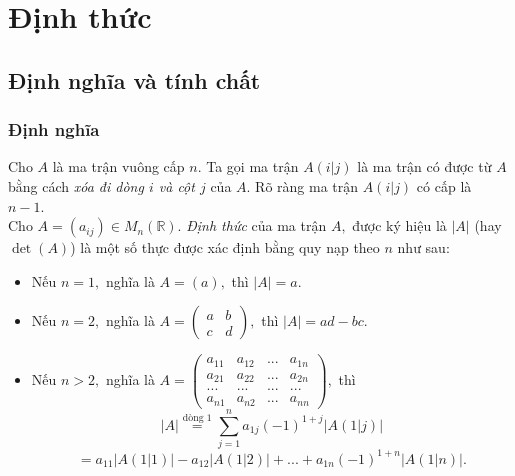 \chapter{Định thức}
\section{Định nghĩa và tính chất}
\subsection{Định nghĩa}
Cho $A$ là ma trận vuông cấp $n.$ Ta gọi ma trận $A\left( {\left. i \right|j} \right)$ là ma trận có được từ $A$ bằng cách \textit{xóa đi dòng $i$ và cột $j$} của $A.$ Rõ ràng ma trận $A\left( {\left. i \right|j} \right)$ có cấp là $n - 1.$\\
Cho $A = \left( {a_{ij}} \right) \in M_n \left( {\mathbb{R}} \right).$  \textit{Định thức} của ma trận $A,$ được ký hiệu là $\left| A \right|$ (hay $\det \left( A \right)$) là một số thực được xác định bằng quy nạp theo $n$ như sau:
\begin{itemize}
\item Nếu $n = 1,$ nghĩa là $A = \left( a \right),$ thì $\left| A \right| = a.$
\item Nếu $n = 2,$ nghĩa là $A = \left( {\begin{array}{*{20}{c}}
  a&b \\ 
  c&d 
\end{array}} \right),$ thì $\left| A \right| = ad - bc.$
\item Nếu $n > 2,$ nghĩa là
$A = \left( {\begin{array}{*{20}{c}}
  {{a_{11}}}&{{a_{12}}}&{...}&{{a_{1n}}} \\ 
  {{a_{21}}}&{{a_{22}}}&{...}&{{a_{2n}}} \\ 
  {...}&{...}&{...}&{...} \\ 
  {{a_{n1}}}&{{a_{n2}}}&{...}&{{a_{nn}}} 
\end{array}} \right),$ 
thì 
$$\left| A \right|\mathop  = \limits^{\text{dòng } 1} \sum\limits_{j = 1}^n {{a_{1j}}{{\left( { - 1} \right)}^{1 + j}}\left| {A\left( {\left. 1 \right|j} \right)} \right|} $$
$$ = {a_{11}}\left| {A\left( {\left. 1 \right|1} \right)} \right| - {a_{12}}\left| {A\left( {\left. 1 \right|2} \right)} \right| + ... + {a_{1n}}{\left( { - 1} \right)^{1 + n}}\left| {A\left( {\left. 1 \right|n} \right)} \right|.$$
\end{itemize}

